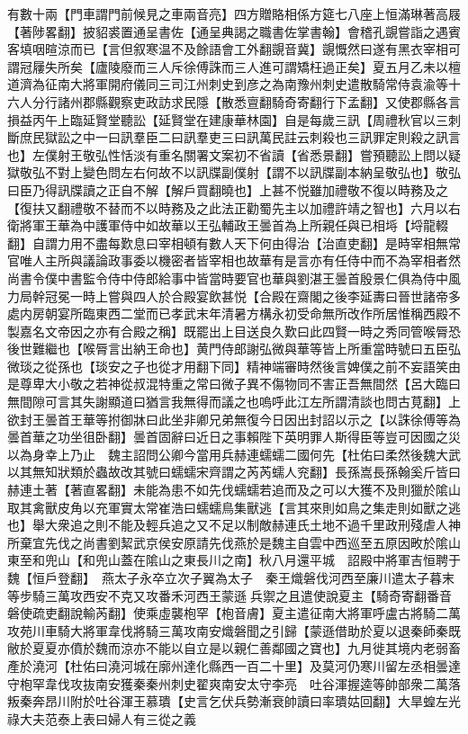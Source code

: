 有數十兩【門車謂門前候見之車兩音亮】四方贈賂相係方筵七八座上恒滿琳著高屐【著陟畧翻】披貂裘置通呈書佐【通呈典謁之職書佐掌書翰】會稽孔覬嘗詣之遇賓客填咽暄涼而已【言但叙寒温不及餘語會工外翻覬音冀】覬慨然曰遂有黑衣宰相可謂冠屨失所矣【廬陵廢而三人斥徐傅誅而三人進可謂矯枉過正矣】夏五月乙未以檀道濟為征南大將軍開府儀同三司江州刺史到彦之為南豫州刺史遣散騎常侍袁渝等十六人分行諸州郡縣觀察吏政訪求民隱【散悉亶翻騎奇寄翻行下孟翻】又使郡縣各言損益丙午上臨延賢堂聽訟【延賢堂在建康華林園】自是每歲三訊【周禮秋官以三刺斷庶民獄訟之中一曰訊羣臣二曰訊羣吏三曰訊萬民註云刺殺也三訊罪定則殺之訊言也】左僕射王敬弘性恬淡有重名關署文案初不省讀【省悉景翻】嘗預聽訟上問以疑獄敬弘不對上變色問左右何故不以訊牒副僕射【謂不以訊牒副本納呈敬弘也】敬弘曰臣乃得訊牒讀之正自不解【解戶買翻曉也】上甚不悦雖加禮敬不復以時務及之【復扶又翻禮敬不替而不以時務及之此法正勸蜀先主以加禮許靖之智也】六月以右衛將軍王華為中護軍侍中如故華以王弘輔政王曇首為上所親任與已相埓【埒龍輟翻】自謂力用不盡每歎息曰宰相頓有數人天下何由得治【治直吏翻】是時宰相無常官唯人主所與議論政事委以機密者皆宰相也故華有是言亦有任侍中而不為宰相者然尚書令僕中書監令侍中侍郎給事中皆當時要官也華與劉湛王曇首殷景仁俱為侍中風力局幹冠冕一時上嘗與四人於合殿宴飲甚悦【合殿在齋閣之後李延夀曰晉世諸帝多處内房朝宴所臨東西二堂而已孝武末年清暑方構永初受命無所改作所居惟稱西殿不製嘉名文帝因之亦有合殿之稱】既罷出上目送良久歎曰此四賢一時之秀同管喉脣恐後世難繼也【喉脣言出納王命也】黄門侍郎謝弘微與華等皆上所重當時號曰五臣弘微琰之從孫也【琰安之子也從才用翻下同】精神端審時然後言婢僕之前不妄語笑由是尊卑大小敬之若神從叔混特重之常曰微子異不傷物同不害正吾無間然【呂大臨曰無間隙可言其失謝顯道曰猶言我無得而議之也嗚呼此江左所謂清談也問古莧翻】上欲封王曇首王華等拊御牀曰此坐非卿兄弟無復今日因出封詔以示之【以誅徐傅等為曇首華之功坐徂卧翻】曇首固辭曰近日之事賴陛下英明罪人斯得臣等豈可因國之災以為身幸上乃止　魏主詔問公卿今當用兵赫連蠕蠕二國何先【杜佑曰柔然後魏大武以其無知狀類於蟲故改其號曰蠕蠕宋齊謂之芮芮蠕人兖翻】長孫嵩長孫翰奚斤皆曰赫連土著【著直畧翻】未能為患不如先伐蠕蠕若追而及之可以大獲不及則獵於隂山取其禽獸皮角以充軍實太常崔浩曰蠕蠕鳥集獸逃【言其來則如鳥之集走則如獸之逃也】舉大衆追之則不能及輕兵追之又不足以制敵赫連氏土地不過千里政刑殘虐人神所棄宜先伐之尚書劉絜武京侯安原請先伐燕於是魏主自雲中西巡至五原因畋於隂山東至和兜山【和兜山蓋在隂山之東長川之南】秋八月還平城　詔殿中將軍吉恒聘于魏【恒戶登翻】　燕太子永卒立次子翼為太子　秦王熾磐伐河西至廉川遣太子暮末等步騎三萬攻西安不克又攻番禾河西王蒙遜兵禦之且遣使說夏主【騎奇寄翻番音磐使疏吏翻說輸芮翻】使乘虛襲枹罕【枹音膚】夏主遣征南大將軍呼盧古將騎二萬攻苑川車騎大將軍韋伐將騎三萬攻南安熾磐聞之引歸【蒙遜借助於夏以退秦師秦既敝於夏夏亦僨於魏而涼亦不能以自立是以親仁善鄰國之寶也】九月徙其境内老弱畜產於澆河【杜佑曰澆河城在廓州達化縣西一百二十里】及莫河仍寒川留左丞相曇達守枹罕韋伐攻抜南安獲秦秦州刺史翟爽南安太守李亮　吐谷渾握逵等帥部衆二萬落叛秦奔昂川附於吐谷渾王慕璝【史言乞伏兵勢漸衰帥讀曰率璝姑回翻】大旱蝗左光祿大夫范泰上表曰婦人有三從之義


